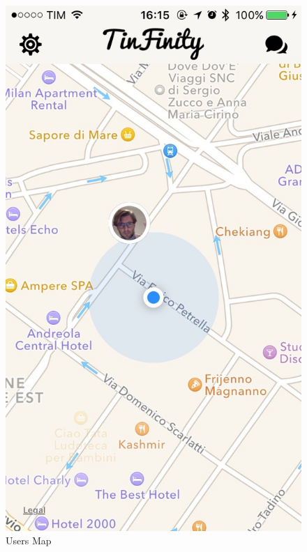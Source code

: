 \begin{multicols}{2}
\begin{figure}[H]
\centering
\centering
\includegraphics[scale=0.15]{./images/map.jpg}
\caption{\label{Expo Map}Users Map}
\end{figure}


\end{multicols}

